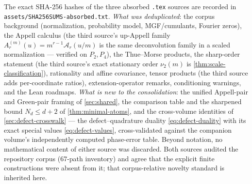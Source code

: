 \documentclass[11pt,oneside]{article}
\numberwithin{equation}{section}
\theoremstyle{definition}
\theoremstyle{remark}
\newcommand{\vtwo}{\nu_2}
\newcommand{\Gd}{\mathcal A}
\begin{document}
The exact SHA-256 hashes of the three absorbed \texttt{.tex} sources
are recorded in \nolinkurl{assets/SHA256SUMS-absorbed.txt}.
\emph{What was deduplicated}: the corpus background (normalization,
probability model, MGF/cumulants, Fourier zeros), the Appell
calculus (the third source's up-Appell family
$A^{(m)}_r(u)=m^{r-1}\Gd_r(u/m)$ is the same deconvolution family in
a scaled normalization --- verified on $P_2,P_4$), the Thue--Morse
products, the sharp-order statement (the third source's exact
stationary order $\vtwo(m)$ is
\cref{thm:scale-classification}), rationality and affine covariance,
tensor products (the third source adds per-coordinate ratios),
extension-operator remarks, conditioning warnings, and the Lean
roadmaps.
\emph{What is new to the consolidation}: the unified Appell-pair and
Green-pair framing of \cref{sec:shared}, the comparison table and the
sharpened bound $N_d\le d+2$ of \cref{thm:minimal-atoms}, and the
cross-volume identities of \cref{sec:defect-crosswalk} --- the
defect--quadrature duality \eqref{eq:defect-duality} with its exact
special values \eqref{eq:defect-values}, cross-validated against the
companion volume's independently computed phase-error table.  Beyond
notation, no mathematical content of either source was discarded.
Both sources audited the repository corpus (67-path inventory) and
agree that the explicit finite constructions were absent from it;
that corpus-relative novelty standard is inherited here.
\end{document}
